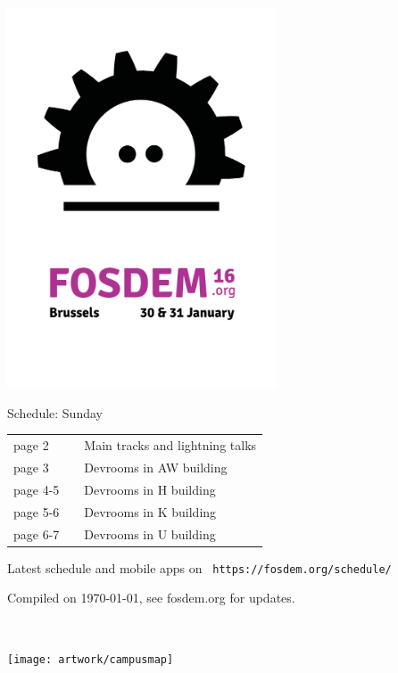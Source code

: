 \documentclass[a4paper,10pt]{article}
\begin{document}
\label{cover}
\begin{center}
\includegraphics[width=0.6\textwidth]{artwork/flyer_nobg}


{\fontsize{35}{45}\selectfont
\bf

Schedule: Sunday
}

\vfill

{\Large
\begin{tabular}{lll}
page 2   & &  Main tracks and lightning talks \\
page 3   & &  Devrooms in AW building \\
page 4-5 & &  Devrooms in H building \\
page 5-6 & &  Devrooms in K building \\
page 6-7 & &  Devrooms in U building \\
\end{tabular}

\vfill

Latest schedule and mobile apps on ~\texttt{https://fosdem.org/schedule/}
}

\vfill

\end{center}

Compiled on {\ddmmyyyydate\today}, see fosdem.org for updates.


{%
\fontsize{10.5}{8.4}\selectfont%
\renewcommand{\arraystretch}{0.9}%
%
%
}



\pagestyle{empty}
\pagebreak
$ $
\pagebreak


\label{backcover}%
\texttt{[image: artwork/campusmap]}
\end{document}
